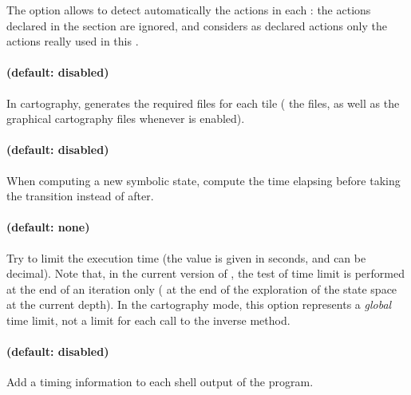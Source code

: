 The option  allows to detect automatically the actions in each \IPTA{}: the actions declared in the  section are ignored, and \imitator{} considers as declared actions only the actions really used in this \IPTA{}.



\paragraph{ (default: disabled)}
In cartography, generates the required files for each tile (\ie{} the  files, as well as the graphical cartography files whenever  is enabled).



\paragraph{ (default: disabled)}
When computing a new symbolic state, compute the time elapsing before taking the transition instead of after.




\paragraph{ (default: none)}
Try to limit the execution time (the value  is given in seconds, and can be decimal).
Note that, in the current version of \imitator{}, the test of time limit is performed at the end of an iteration only (\ie{} at the end of the exploration of the state space at the current depth).
In the cartography mode, this option represents a \emph{global} time limit, not a limit for each call to the inverse method.


\paragraph{ (default: disabled)}
Add a timing information to each shell output of the program.






